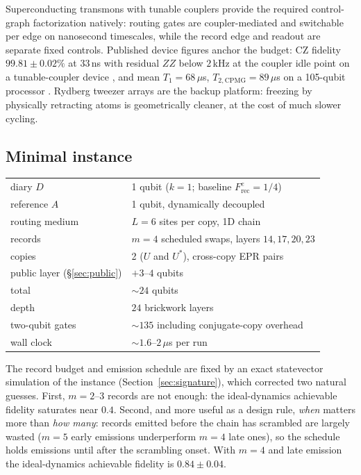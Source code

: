 \documentclass[11pt]{article}
\newcommand{\Frec}{F^{e}_{\mathrm{rec}}}
\begin{document}
Superconducting transmons with tunable couplers provide the required
control-graph factorization natively: routing gates are
coupler-mediated and switchable per edge on nanosecond timescales,
while the record edge and readout are separate fixed controls.
Published device figures anchor the budget: CZ fidelity
$99.81 \pm 0.02\%$ at $33$\,ns with residual $ZZ$ below $2$\,kHz at
the coupler idle point on a tunable-coupler device
\citep{Marxer2023}, and mean $T_1 = 68\,\mu$s,
$T_{2,\mathrm{CPMG}} = 89\,\mu$s on a 105-qubit processor
\citep{GoogleQEC2024}.  Rydberg tweezer arrays are the backup
platform: freezing by physically retracting atoms is geometrically
cleaner, at the cost of much slower cycling.

\subsection{Minimal instance}

\begin{center}
\begin{tabular}{@{}ll@{}}
\toprule
diary $D$ & 1 qubit ($k{=}1$; baseline $\Frec = 1/4$) \\
reference $A$ & 1 qubit, dynamically decoupled \\
routing medium & $L = 6$ sites per copy, 1D chain \\
records & $m = 4$ scheduled swaps, layers $14, 17, 20, 23$ \\
copies & 2 ($U$ and $U^*$), cross-copy EPR pairs \\
public layer (\S\ref{sec:public}) & $+3$--$4$ qubits \\
total & $\sim 24$ qubits \\
depth & $24$ brickwork layers \\
two-qubit gates & $\sim 135$ including conjugate-copy overhead \\
wall clock & $\sim 1.6$--$2\,\mu$s per run \\
\bottomrule
\end{tabular}
\end{center}

The record budget and emission schedule are fixed by an exact
statevector simulation of the instance
(Section~\ref{sec:signature}), which corrected two natural guesses.
First, $m = 2$--$3$ records are not enough: the ideal-dynamics
achievable fidelity saturates near $0.4$.  Second, and more useful as
a design rule, \emph{when} matters more than \emph{how many}:
records emitted before the chain has scrambled are largely wasted
($m = 5$ early emissions underperform $m = 4$ late ones), so the
schedule holds emissions until after the scrambling onset.  With
$m = 4$ and late emission the ideal-dynamics achievable fidelity is
$0.84 \pm 0.04$.
\end{document}
